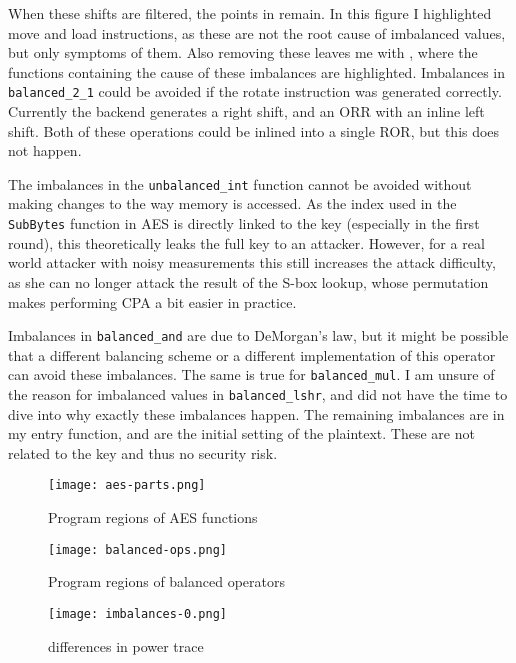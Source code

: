 When these shifts are filtered, the points in  remain.
In this figure I highlighted move and load instructions, as these are not the root cause of imbalanced values, but only symptoms of them.
Also removing these leaves me with , where the functions containing the cause of these imbalances are highlighted.
Imbalances in \texttt{balanced\_2\_1} could be avoided if the rotate instruction was generated correctly.
Currently the backend generates a right shift, and an ORR with an inline left shift.
Both of these operations could be inlined into a single ROR, but this does not happen.

The imbalances in the \texttt{unbalanced\_int} function cannot be avoided without making changes to the way memory is accessed.
As the index used in the \texttt{SubBytes} function in AES is directly linked to the key (especially in the first round), this theoretically leaks the full key to an attacker.
However, for a real world attacker with noisy measurements this still increases the attack difficulty, as she can no longer attack the result of the S-box lookup, whose permutation makes performing CPA a bit easier in practice.

Imbalances in \texttt{balanced\_and} are due to DeMorgan's law, but it might be possible that a different balancing scheme or a different implementation of this operator can avoid these imbalances.
The same is true for \texttt{balanced\_mul}.
I am unsure of the reason for imbalanced values in \texttt{balanced\_lshr}, and did not have the time to dive into why exactly these imbalances happen.
The remaining imbalances are in my entry function, and are the initial setting of the plaintext.
These are not related to the key and thus no security risk.

\begin{sidewaysfigure}[ht]
  \centering
  \texttt{[image: aes-parts.png]}
  \caption{Program regions of AES functions}
  \label{fig:aes}
\end{sidewaysfigure}

\begin{sidewaysfigure}[h]
  \centering
  \texttt{[image: balanced-ops.png]}
  \caption{Program regions of balanced operators}
  \label{fig:ops}
\end{sidewaysfigure}

\begin{sidewaysfigure}[h]
  \centering
  \texttt{[image: imbalances-0.png]}
  \caption{\hammingw{} differences in power trace}
  \label{fig:imbalances0}
\end{sidewaysfigure}

